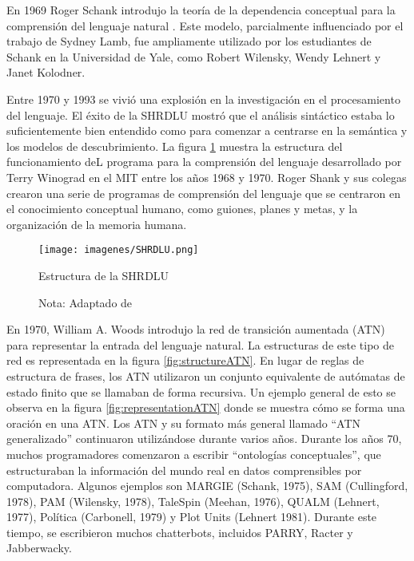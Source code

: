 \documentclass[12pt]{article}
\begin{document}
			
			En 1969 Roger Schank introdujo la teoría de la dependencia conceptual para la comprensión del lenguaje natural . Este modelo, parcialmente influenciado por el trabajo de Sydney Lamb, fue ampliamente utilizado por los estudiantes de Schank en la Universidad de Yale, como Robert Wilensky, Wendy Lehnert y Janet Kolodner.\cite{Schank1969}
			
			Entre 1970 y 1993 se vivió una explosión en la investigación en el procesamiento del lenguaje. El éxito de la SHRDLU mostró que el análisis sintáctico estaba lo suficientemente bien entendido como para comenzar a centrarse en la semántica y los modelos de descubrimiento. La figura \ref{fig:SHRDLU} muestra la estructura del funcionamiento deL programa para la comprensión del lenguaje desarrollado por Terry Winograd en el MIT entre los años 1968 y 1970. Roger Shank y sus colegas crearon una serie de programas de comprensión del lenguaje que se centraron en el conocimiento conceptual humano, como guiones, planes y metas, y la organización de la memoria humana.\cite{Kumar2011}
			
	
			\begin{figure}[H]
				\texttt{[image: imagenes/SHRDLU.png]}
				\centering
				\caption{Estructura de la SHRDLU}
				\caption*{\small Nota: Adaptado de  \cite{Schubert2020}}
				\label{fig:SHRDLU}
			\end{figure}
	
			
			En 1970, William A. Woods introdujo la red de transición aumentada (ATN) para representar la entrada del lenguaje natural. La estructuras de este tipo de red es representada en la figura \ref{fig:structureATN}. En lugar de reglas de estructura de frases, los ATN utilizaron un conjunto equivalente de autómatas de estado finito que se llamaban de forma recursiva. Un ejemplo general de esto se observa en la figura \ref{fig:representationATN} donde se muestra cómo se forma una oración en una ATN. Los ATN y su formato más general llamado ``ATN generalizado'' continuaron utilizándose durante varios años. Durante los años 70, muchos programadores comenzaron a escribir ``ontologías conceptuales'', que estructuraban la información del mundo real en datos comprensibles por computadora. Algunos ejemplos son MARGIE (Schank, 1975), SAM (Cullingford, 1978), PAM (Wilensky, 1978), TaleSpin (Meehan, 1976), QUALM (Lehnert, 1977), Política (Carbonell, 1979) y Plot Units (Lehnert 1981).  Durante este tiempo, se escribieron muchos chatterbots, incluidos PARRY, Racter y Jabberwacky.  \cite{Woods1970}
			
\end{document}
